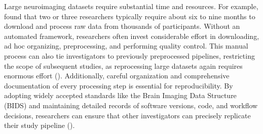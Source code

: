 Large neuroimaging datasets require substantial time and resources. 
For example, \cite{horien2021hitchhiker} found that two or three researchers typically 
require about six to nine months to download and process raw data from thousands of participants. 
Without an automated framework, researchers often invest considerable effort in downloading, 
ad hoc organizing, preprocessing, and performing quality control. 
This manual process can also tie investigators to previously preprocessed pipelines, 
restricting the scope of subsequent studies, as reprocessing large datasets again 
requires enormous effort (\cite{horien2021hitchhiker}). 
Additionally, careful organization and comprehensive documentation of every processing step is essential for reproducibility. 
By adopting widely accepted standards like the Brain Imaging Data Structure (BIDS) and 
maintaining detailed records of software versions, code, and workflow decisions, 
researchers can ensure that other investigators can precisely replicate their study pipeline (\cite{white2022data, horien2021hitchhiker}). 

